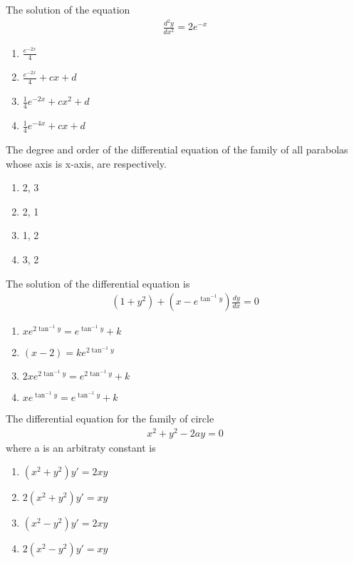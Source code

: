 \item The solution of the equation
\begin{align*}
\frac{d^{2}y}{dx^{2}} = 2e^{-x}
\end{align*}
\begin{enumerate}
\item $\frac{e^{-2x}}{4}$
\item $\frac{e^{-2x}}{4} + cx + d$
\item $\frac{1}{4}e^{-2x} + cx^{2} + d$
\item $\frac{1}{4}e^{-4x} + cx + d$
\end{enumerate}

\item The degree and order of the differential equation of the family of all parabolas whose axis is x-axis, are respectively.
\begin{enumerate}
\item 2, 3
\item 2, 1
\item 1, 2
\item 3, 2
\end{enumerate}

\item The solution of the differential equation is
\begin{align*}
(1 + y^{2}) + (x - e^{\tan^{-1}y})\frac{dy}{dx} = 0
\end{align*}
\begin{enumerate}
\item $xe^{2\tan^{-1}y} = e^{\tan^{-1}y} + k$
\item $(x - 2) = ke^{2\tan^{-1}y}$
\item $2xe^{2\tan^{-1}y} = e^{2\tan^{-1}y} + k$
\item $xe^{\tan^{-1}y} = e^{\tan^{-1}y} + k$
\end{enumerate}

\item The differential equation for the family of circle
\begin{align}
x^2 + y^2 -2ay = 0
\end{align}
where a is an arbitraty constant is
\begin{enumerate}
\item $(x^2 + y^2)y' = 2xy$
\item $2(x^2 + y^2)y' = xy$
\item $(x^2 - y^2)y' = 2xy$
\item $2(x^2 - y^2)y' = xy$
\end{enumerate}

